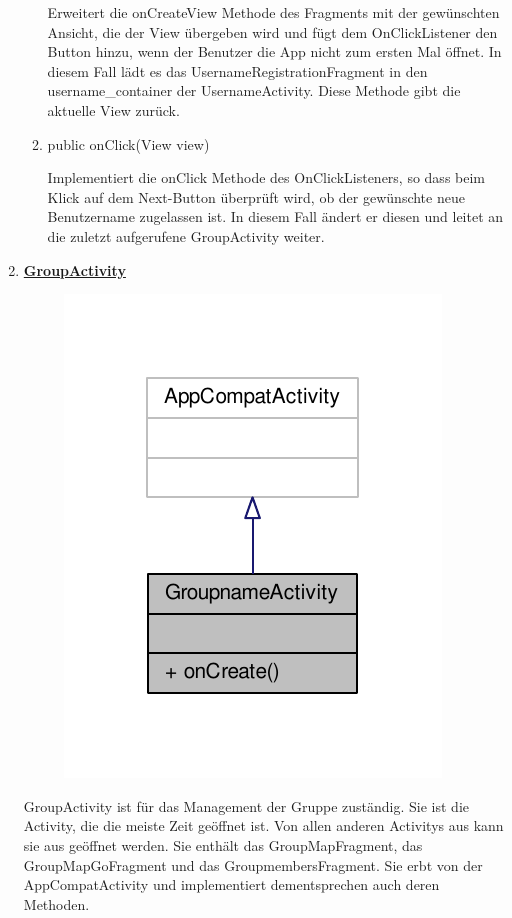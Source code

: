 \begin{enumerate}
\begin{enumerate}
		Erweitert die onCreateView Methode des Fragments mit der gewünschten Ansicht, die der View übergeben wird und fügt dem OnClickListener den Button hinzu, wenn der Benutzer die App nicht zum ersten Mal öffnet. In diesem Fall lädt es das UsernameRegistrationFragment in den username\_container der UsernameActivity. Diese Methode gibt die aktuelle View zurück.
		
		\item public onClick(View view)
		
		Implementiert die onClick Methode des OnClickListeners, so dass beim Klick auf dem Next-Button überprüft wird, ob der gewünschte neue Benutzername zugelassen ist. In diesem Fall ändert er diesen und leitet an die zuletzt aufgerufene GroupActivity weiter.
	\end{enumerate}
	
	\item \textbf{\underline{GroupActivity}}
	
	\begin{figure}[H]
		\includegraphics[scale = 1]{res/groupname_activity__inherit__graph.pdf}
		\centering
	\end{figure}
	GroupActivity ist für das Management der Gruppe zuständig. Sie ist die Activity, die die meiste Zeit geöffnet ist. Von allen anderen Activitys aus kann sie aus geöffnet werden. Sie enthält das GroupMapFragment, das GroupMapGoFragment und das GroupmembersFragment. Sie erbt von der AppCompatActivity und implementiert dementsprechen auch deren Methoden.
	

\end{enumerate}
